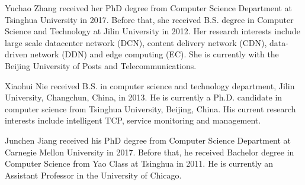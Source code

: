 \documentclass[10pt,journal,compsoc]{IEEEtran}
\begin{document}






%


\newpage

\begin{IEEEbiography}
{Yuchao Zhang} received her PhD degree from Computer Science Department at Tsinghua University in 2017. Before that, she received B.S. degree in Computer Science and Technology at Jilin University in 2012. Her research interests include large scale datacenter network (DCN), content delivery network (CDN), data-driven network (DDN) and edge computing (EC). She is currently with the Beijing University of Posts and Telecommunications.
\end{IEEEbiography}

\begin{IEEEbiography}
{Xiaohui Nie} received B.S. in computer science and technology department, Jilin University, Changchun, China, in 2013. He is currently a Ph.D. candidate in computer science from Tsinghua University, Beijing, China. His current research interests include intelligent TCP, service monitoring and management.
\end{IEEEbiography}

\begin{IEEEbiography}
{Junchen Jiang} received his PhD degree from Computer Science Department at Carnegie Mellon University in 2017. Before that, he received Bachelor degree in Computer Science from Yao Class at Tsinghua in 2011. He is currently an Assistant Professor in the University of Chicago.
\end{IEEEbiography}
\end{document}
